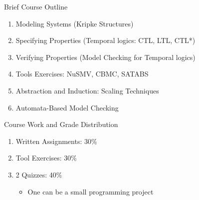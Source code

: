 \documentclass{beamer}
\begin{document}
\begin{frame}{Brief Course Outline}
\begin{enumerate}
\item Modeling Systems (Kripke Structures)
\item Specifying Properties (Temporal logics: CTL, LTL, CTL*)
\item Verifying Properties (Model Checking for Temporal logics)
\item Tools Exercises: NuSMV, CBMC, SATABS
\item Abstraction and Induction: Scaling Techniques
\item Automata-Based Model Checking
\end{enumerate}
\end{frame}

\begin{frame}{Course Work and Grade Distribution}
\begin{enumerate}
\item  Written Assignments: 30\%

\item  Tool Exercises: 30\%

\item  2 Quizzes: 40\%
\begin{itemize}
\item One can be a small programming project
\end{itemize}
\end{enumerate}
\end{frame}
\end{document}

